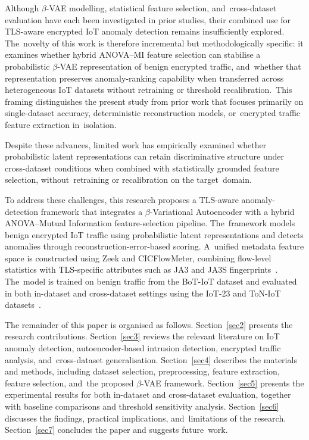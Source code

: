 \documentclass[futureinternet,article,accept,moreauthors]{Definitions/mdpi}
\begin{document}
Although $\beta$-VAE modelling, statistical feature selection, and~cross-dataset evaluation have each been investigated in prior studies, their combined use for TLS-aware encrypted IoT anomaly detection remains insufficiently explored. The~novelty of this work is therefore incremental but methodologically specific: it examines whether hybrid ANOVA--MI feature selection can stabilise a probabilistic $\beta$-VAE representation of benign encrypted traffic, and~whether that representation preserves anomaly-ranking capability when transferred across heterogeneous IoT datasets without retraining or threshold recalibration.~This framing distinguishes the present study from prior work that focuses primarily on single-dataset accuracy, deterministic reconstruction models, or~encrypted traffic feature extraction in~isolation.

Despite these advances, limited work has empirically examined whether probabilistic latent representations can retain discriminative structure under cross-dataset conditions when combined with statistically grounded feature selection, without~retraining or recalibration on the target~domain.

To address these challenges, this research proposes a TLS-aware anomaly-detection framework that integrates a $\beta$-Variational Autoencoder with a hybrid ANOVA--Mutual Information feature-selection pipeline. The~framework models benign encrypted IoT traffic using probabilistic latent representations and detects anomalies through reconstruction-error-based scoring. A~unified metadata feature space is constructed using Zeek and CICFlowMeter, combining flow-level statistics with TLS-specific attributes such as JA3 and JA3S fingerprints~\cite{althouse2019}. The~model is trained on benign traffic from the BoT-IoT dataset and evaluated in both in-dataset and cross-dataset settings using the IoT-23 and ToN-IoT datasets~\cite{garcia2020,moustafa2021a}.

The remainder of this paper is organised as follows. Section~\ref{sec2} presents the research contributions. Section~\ref{sec3} reviews the relevant literature on IoT anomaly detection, autoencoder-based intrusion detection, encrypted traffic analysis, and~cross-dataset generalisation. Section~\ref{sec4} describes the materials and methods, including dataset selection, preprocessing, feature extraction, feature selection, and~the proposed $\beta$-VAE framework. Section~\ref{sec5} presents the experimental results for both in-dataset and cross-dataset evaluation, together with baseline comparisons and threshold sensitivity analysis. Section~\ref{sec6} discusses the findings, practical implications, and~limitations of the research. Section~\ref{sec7} concludes the paper and suggests future~work.
\end{document}
